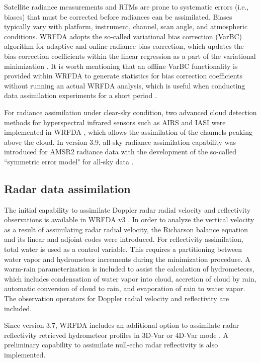 Satellite radiance measurements and RTMs are prone to systematic errors (i.e., biases) that must be
corrected before radiances can be assimilated. Biases typically vary with platform, instrument, channel,
scan angle, and atmospheric conditions. WRFDA adopts the so-called variational bias correction (VarBC) 
algorithm for adaptive and online radiance bias correction, which updates the bias correction coefficients
within the linear regression as a part of the variational minimization \citep{dee04,auligne07}.
It is worth mentioning that an offline VarBC functionality is provided within WRFDA to generate statistics for bias correction
coefficients without running an actual WRFDA analysis, which is useful when conducting data assimilation
experiments for a short period \citep{liu12}.

For radiance assimilation under clear-sky condition, two advanced cloud detection methods for hyperspectral infrared sensors 
such as AIRS and IASI were implemented in WRFDA \citep{xu13, xu14, xu15, auligne14a, auligne14b}, 
which allows the assimilation of the channels peaking above the cloud.
In version 3.9, all-sky radiance assimilation capability was introduced for AMSR2 radiance data \citep{yang16} 
with the development of the so-called ``symmetric error model" for all-sky data \citep{geer11}.

\subsection{Radar data assimilation}

The initial capability to assimilate Doppler radar radial velocity and reflectivity observations is available in WRFDA v3
\citep{xiao05, xiao07, xiao072, xiao08}. In order to analyze the vertical velocity as a result of
assimilating radar radial velocity, the Richarson balance equation
 and its linear and adjoint codes were introduced.
For reflectivity assimilation, total water is used as a control variable. 
This requires a partitioning between water vapor and hydrometeor increments during the minimization procedure.
A warm-rain parameterization is included to assist the calculation of hydrometeors, which includes condensation of water vapor
into cloud, accretion of cloud by rain, automatic conversion of cloud to rain, and evaporation of rain to water vapor.
The observation operators for Doppler radial velocity and reflectivity are included.

Since version 3.7, WRFDA includes an additional option to assimilate radar reflectivity retrieved hydrometeor profiles 
in 3D-Var or 4D-Var mode \citep{wang13a, wang13b, sun13}. A preliminary capability to assimilate 
null-echo radar reflectivity is also implemented.

